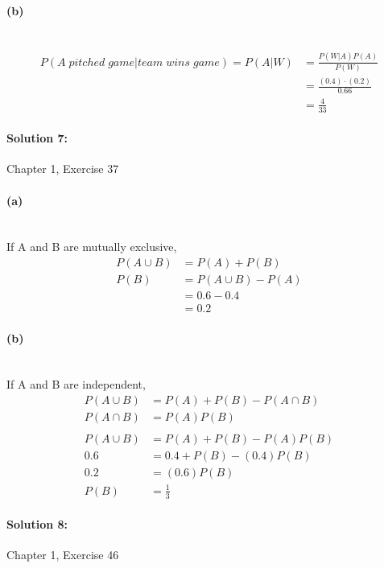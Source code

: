 \documentclass[a4paper]{article}
\begin{document}
\paragraph{(b)} ~\\
\begin{align*}
P(A \; pitched \; game|team \; wins \; game) = P(A|W) &= \frac{P(W|A)P(A)}{P(W)} \\
                                                      &= \frac{(0.4) \cdot (0.2)}{0.66} \\
                                                      &= \frac{4}{33}
\end{align*}

\paragraph{Solution 7:}
Chapter 1, Exercise 37

\paragraph{(a)} ~\\

\indent If A and B are mutually exclusive,
\begin{align*}
P(A \cup B) &= P(A) + P(B) \\
       P(B) &= P(A \cup B) - P(A) \\
            &= 0.6 - 0.4 \\
            &= 0.2
\end{align*}

\paragraph{(b)} ~\\

\indent If A and B are independent,
\begin{align*}
P(A \cup B) &= P(A) + P(B) - P(A \cap B) \\
P(A \cap B) &= P(A)P(B) \\ \\
P(A \cup B) &= P(A) + P(B) - P(A)P(B) \\
        0.6 &= 0.4 + P(B) - (0.4)P(B) \\
        0.2 &= (0.6)P(B) \\
       P(B) &= \frac{1}{3}
\end{align*}

\paragraph{Solution 8:}
Chapter 1, Exercise 46
\end{document}
